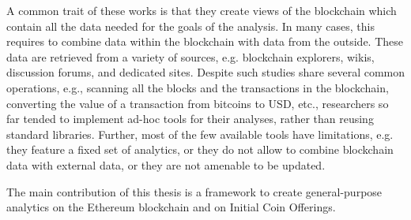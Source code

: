 A common trait of these works is that they create views of the blockchain which contain all the data needed for the goals of the analysis. In many cases, this requires to combine data within the blockchain with data from the outside. These data are retrieved from a variety of sources, e.g. blockchain explorers, wikis, discussion forums, and dedicated sites. Despite such studies share several common operations, e.g., scanning all the blocks and the transactions in the blockchain, converting the value of a transaction from bitcoins to USD, etc., researchers so far tended to implement ad-hoc tools for their analyses, rather than reusing standard libraries. Further, most of the few available tools have limitations, e.g. they feature a fixed set of analytics, or they
do not allow to combine blockchain data with external data, or they are not amenable to be updated.

The main contribution of this thesis is a framework to create
general-purpose analytics on the Ethereum blockchain and on Initial Coin Offerings.